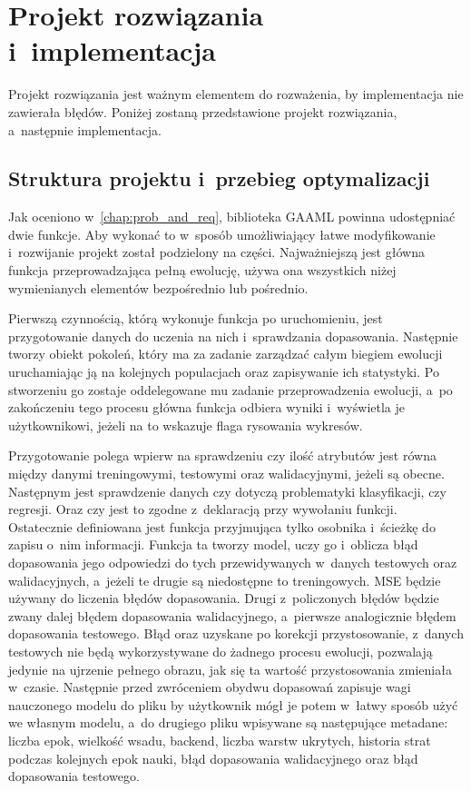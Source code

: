 \chapter{Projekt rozwiązania i~implementacja}
\label{chap:sol_and_impl}
Projekt rozwiązania jest ważnym elementem do rozważenia,
by implementacja nie zawierała błędów.
Poniżej zostaną przedstawione projekt rozwiązania,
a~następnie implementacja.

\section{Struktura projektu i~przebieg optymalizacji}
\label{sec:proj_struct}
Jak oceniono w~\cref{chap:prob_and_req},
biblioteka \gls{GAAML} powinna
udostępniać dwie funkcje.
Aby wykonać to w~sposób umożliwiający
łatwe modyfikowanie i~rozwijanie
projekt został podzielony na części.
Najważniejszą jest główna funkcja
przeprowadzająca pełną ewolucję,
używa ona wszystkich niżej wymienianych
elementów bezpośrednio lub pośrednio.

Pierwszą czynnością, którą wykonuje
funkcja po uruchomieniu,
jest przygotowanie danych do uczenia
na nich i~sprawdzania dopasowania.
Następnie tworzy obiekt pokoleń,
który ma za zadanie zarządzać całym
biegiem ewolucji uruchamiając
ją na kolejnych populacjach
oraz zapisywanie ich statystyki.
Po stworzeniu go zostaje oddelegowane
mu zadanie przeprowadzenia ewolucji,
a~po zakończeniu tego procesu główna
funkcja odbiera wyniki i~wyświetla je użytkownikowi,
jeżeli na to wskazuje flaga rysowania wykresów.

Przygotowanie polega wpierw na sprawdzeniu
czy ilość atrybutów jest równa między danymi treningowymi,
testowymi oraz walidacyjnymi, jeżeli są obecne.
Następnym jest sprawdzenie danych czy dotyczą
problematyki klasyfikacji, czy regresji.
Oraz czy jest to zgodne z~deklaracją
przy wywołaniu funkcji.
Ostatecznie definiowana jest funkcja przyjmująca
tylko osobnika i~ścieżkę do zapisu o~nim informacji.
Funkcja ta tworzy model, uczy go i~oblicza
błąd dopasowania jego odpowiedzi do tych
przewidywanych w~danych testowych oraz walidacyjnych,
a~jeżeli te drugie są niedostępne to treningowych.
\gls{MSE} będzie używany do liczenia błędów dopasowania.
Drugi z~policzonych błędów będzie zwany
dalej błędem dopasowania walidacyjnego,
a~pierwsze analogicznie błędem dopasowania testowego.
Błąd oraz uzyskane po korekcji przystosowanie,
z~danych testowych nie będą wykorzystywane
do żadnego procesu ewolucji,
pozwalają jedynie na ujrzenie pełnego obrazu,
jak się ta wartość przystosowania zmieniała w~czasie.
Następnie przed zwróceniem obydwu dopasowań
zapisuje wagi nauczonego modelu do pliku
by użytkownik mógł je potem w~łatwy
sposób użyć we własnym modelu,
a~do drugiego pliku wpisywane
są następujące metadane: liczba epok,
wielkość wsadu, backend, liczba warstw ukrytych,
historia strat podczas kolejnych epok nauki,
błąd dopasowania walidacyjnego
oraz błąd dopasowania testowego.

